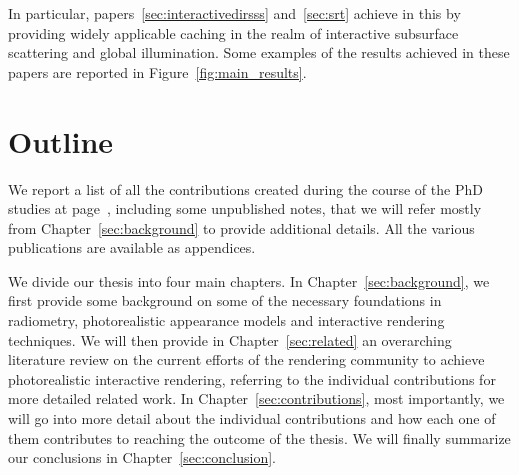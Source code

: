 In particular, papers~\ref{sec:interactivedirsss} and~\ref{sec:srt} achieve in this by providing widely applicable caching in the realm of interactive subsurface scattering and global illumination. Some examples of the results achieved in these papers are reported in Figure~\ref{fig:main_results}.

\section{Outline}

We report a list of all the contributions created during the course of the PhD studies at page~\pageref{sec:contributionlist}, including some unpublished notes, that we will refer mostly from Chapter~\ref{sec:background} to provide additional details. All the various publications are available as appendices. 

We divide our thesis into four main chapters. In Chapter~\ref{sec:background}, we first provide some background on some of the necessary foundations in radiometry, photorealistic appearance models and interactive rendering techniques. We will then provide in Chapter~\ref{sec:related} an overarching literature review on the current efforts of the rendering community to achieve photorealistic interactive rendering, referring to the individual contributions for more detailed related work. In Chapter~\ref{sec:contributions}, most importantly, we will go into more detail about the individual contributions and how each one of them contributes to reaching the outcome of the thesis. We will finally summarize our conclusions in Chapter~\ref{sec:conclusion}. 
